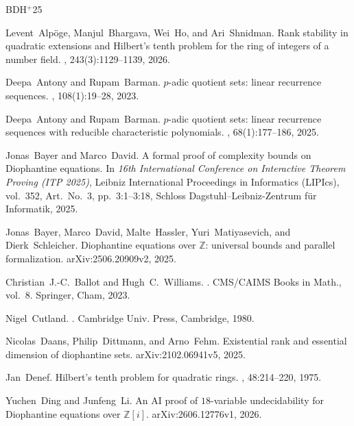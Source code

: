 \documentclass[12pt]{amsart}
\numberwithin{equation}{section}
\theoremstyle{remark}
\theoremstyle{plain}
\newcommand{\Z}{\mathbb{Z}}
\begin{document}
\begin{thebibliography}{BDH$^+$25}

Levent~Alp\"oge, Manjul~Bhargava, Wei~Ho, and Ari~Shnidman.
\newblock Rank stability in quadratic extensions and Hilbert's tenth problem for the ring of integers of a number field.
, 243(3):1129--1139, 2026.

Deepa~Antony and Rupam~Barman.
\newblock $p$-adic quotient sets: linear recurrence sequences.
, 108(1):19--28, 2023.

Deepa~Antony and Rupam~Barman.
\newblock $p$-adic quotient sets: linear recurrence sequences with reducible characteristic polynomials.
, 68(1):177--186, 2025.

Jonas~Bayer and Marco~David.
\newblock A formal proof of complexity bounds on Diophantine equations.
\newblock In {\em 16th International Conference on Interactive Theorem Proving (ITP 2025)},
Leibniz International Proceedings in Informatics (LIPIcs), vol.~352, Art.~No.~3,
pp.~3:1--3:18, Schloss Dagstuhl--Leibniz-Zentrum f\"ur Informatik, 2025.

Jonas~Bayer, Marco~David, Malte~Hassler, Yuri~Matiyasevich, and Dierk~Schleicher.
\newblock Diophantine equations over $\Z$: universal bounds and parallel formalization.
\newblock arXiv:2506.20909v2, 2025.

Christian~J.-C.~Ballot and Hugh~C.~Williams.
.
\newblock CMS/CAIMS Books in Math., vol.~8. Springer, Cham, 2023.

Nigel~Cutland.
.
\newblock Cambridge Univ. Press, Cambridge, 1980.

Nicolas~Daans, Philip~Dittmann, and Arno~Fehm.
\newblock Existential rank and essential dimension of diophantine sets.
\newblock arXiv:2102.06941v5, 2025.

Jan~Denef.
\newblock Hilbert's tenth problem for quadratic rings.
, 48:214--220, 1975.

Yuchen~Ding and Junfeng~Li.
\newblock An AI proof of $18$-variable undecidability for Diophantine equations over $\Z[i]$.
\newblock arXiv:2606.12776v1, 2026.


\end{thebibliography}
\end{document}
